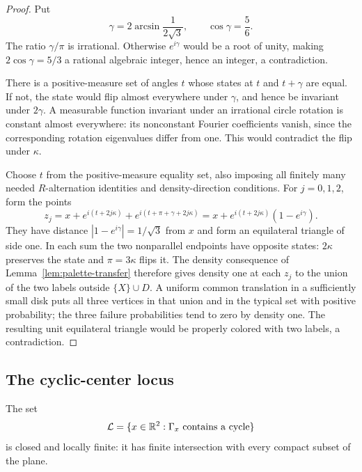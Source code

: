 \begin{proof}
Put
\[
 \gamma=2\arcsin\frac1{2\sqrt3},
 \qquad \cos\gamma=\frac56.
\]
The ratio $\gamma/\pi$ is irrational.  Otherwise $e^{i\gamma}$ would
be a root of unity, making $2\cos\gamma=5/3$ a rational algebraic
integer, hence an integer, a contradiction.

There is a positive-measure set of angles $t$ whose states at $t$ and
$t+\gamma$ are equal.  If not, the state would flip almost everywhere
under $\gamma$, and hence be invariant under $2\gamma$.  A measurable
function invariant under an irrational circle rotation is constant
almost everywhere: its nonconstant Fourier coefficients vanish, since
the corresponding rotation eigenvalues differ from one.  This would
contradict the flip under $\kappa$.

Choose $t$ from the positive-measure equality set, also imposing all
finitely many needed $R$-alternation identities and density-direction
conditions.  For $j=0,1,2$, form the points
\[
 z_j=x+e^{i(t+2j\kappa)}+e^{i(t+\pi+\gamma+2j\kappa)}
     =x+e^{i(t+2j\kappa)}(1-e^{i\gamma}).
\]
They have distance $|1-e^{i\gamma}|=1/\sqrt3$ from $x$ and form an
equilateral triangle of side one.  In each sum the two nonparallel
endpoints have opposite states: $2\kappa$ preserves the state and
$\pi=3\kappa$ flips it.  The density consequence of
Lemma~\ref{lem:palette-transfer} therefore gives density one at each
$z_j$ to the union of the two labels outside $\{X\}\cup D$.
A uniform common translation in a sufficiently small disk puts all
three vertices in that union and in the typical set with positive
probability; the three failure probabilities tend to zero by density
one.  The resulting unit equilateral triangle would be properly
colored with two labels, a contradiction.
\end{proof}

\subsection{The cyclic-center locus}

\begin{theorem}
\label{thm:cyclic-local-finiteness}
The set
\begin{equation}
 \mathcal L=\{x\in\mathbb R^2:\Gamma_x\text{ contains a cycle}\}
 \label{eq:source-19}
\end{equation}
is closed and locally finite: it has finite intersection with every
compact subset of the plane.
\end{theorem}

